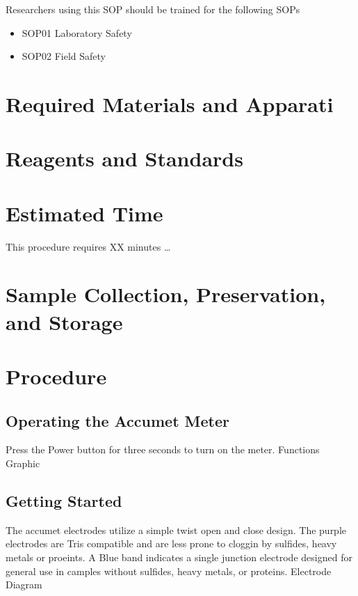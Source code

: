\documentclass[12pt]{../SOP3_beta}\usepackage[]{graphicx}\usepackage[]{color}
\begin{document}
\NP Researchers using this SOP should be trained for the following SOPs

\begin{itemize}
  \item SOP01 Laboratory Safety
  \item SOP02 Field Safety
\end{itemize}

\section{Required Materials and Apparati}




\section{Reagents and Standards}

\section{Estimated Time}

\NP This procedure requires XX minutes \dots

\section{Sample Collection, Preservation, and Storage}

\section{Procedure}

\subsection{Operating the Accumet Meter}

\NP Press the Power button for three seconds to turn on the meter.
\NP Functions Graphic

\subsection{Getting Started}

The accumet electrodes utilize a simple twist open and close design. The purple electrodes are Tris compatible and are less prone to cloggin by sulfides, heavy metals or proeints. A Blue band indicates a single junction electrode designed for general use in camples without sulfides, heavy metals, or proteins.
\NP Electrode Diagram
\end{document}
